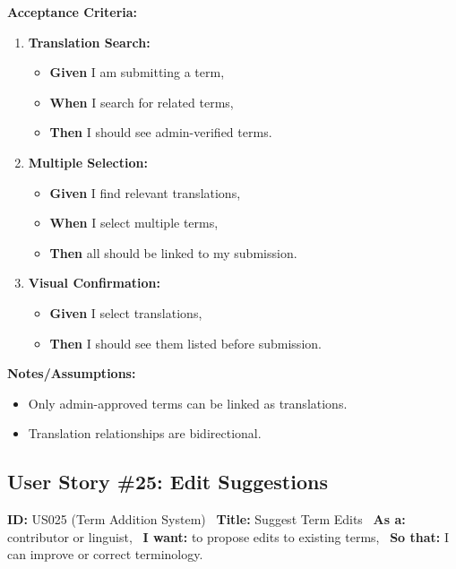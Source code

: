 \documentclass[12pt]{article}
\begin{document}
\vspace{1em}
\textbf{Acceptance Criteria:}
\begin{enumerate}
\item \textbf{Translation Search:}
\begin{itemize}
\item \textbf{Given} I am submitting a term,
\item \textbf{When} I search for related terms,
\item \textbf{Then} I should see admin-verified terms.
\end{itemize}

\item \textbf{Multiple Selection:}
\begin{itemize}
    \item \textbf{Given} I find relevant translations,
    \item \textbf{When} I select multiple terms,
    \item \textbf{Then} all should be linked to my submission.
\end{itemize}

\item \textbf{Visual Confirmation:}
\begin{itemize}
    \item \textbf{Given} I select translations,
    \item \textbf{Then} I should see them listed before submission.
\end{itemize}
\end{enumerate}

\vspace{1em}
\textbf{Notes/Assumptions:}
\begin{itemize}
\item Only admin-approved terms can be linked as translations.
\item Translation relationships are bidirectional.
\end{itemize}

\subsection{User Story \#25: Edit Suggestions}
\textbf{ID:} US025 (Term Addition System) \
\textbf{Title:} Suggest Term Edits \
\textbf{As a:} contributor or linguist, \
\textbf{I want:} to propose edits to existing terms, \
\textbf{So that:} I can improve or correct terminology.
\end{document}
